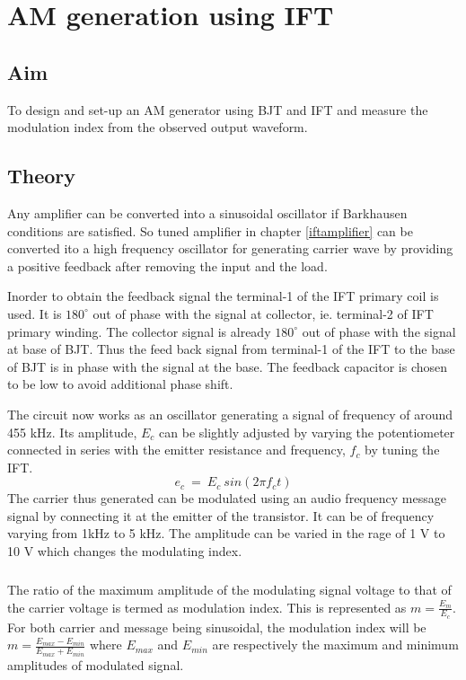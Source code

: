 \chapter[AM generation using IFT]{AM generation using IFT}

\section*{Aim}
To design and set-up  an AM generator using BJT and IFT and measure the modulation index from the observed output waveform.

\section*{Theory}
Any amplifier can be converted into a sinusoidal oscillator if Barkhausen conditions are satisfied. So tuned amplifier in chapter \ref{iftamplifier} can be converted ito a high frequency oscillator for generating carrier wave by providing a positive feedback after removing  the input and the load.

Inorder to obtain the feedback signal the terminal-1 of the IFT primary coil is used. It is $180^{\circ}$ out of phase with the signal at collector, ie. terminal-2 of IFT primary winding. The collector signal is already $180^{\circ}$ out of phase with the signal at base of BJT. Thus the feed back signal from terminal-1 of the IFT to the base of BJT is in phase with the signal at the base. The feedback capacitor is chosen to be low to avoid additional phase shift.  

The circuit now works as an oscillator generating a signal of frequency of around 455 kHz. Its amplitude, $E_c$ can be slightly adjusted by varying the potentiometer connected in series with the emitter resistance and frequency, $f_c$ by tuning the IFT.
\begin{equation}
e_c\ =\ E_c\ sin(2\pi f_ct)
\end{equation}
The carrier thus generated can be modulated using an audio frequency message signal by connecting it at the emitter of the transistor. It can be of frequency varying from 1kHz to 5 kHz. The amplitude can be varied in the rage of 1 V to 10 V which changes the modulating index.


\paragraph{}
The ratio of the maximum amplitude of the modulating signal voltage to that of the carrier voltage is termed as modulation index. This is represented as $m=\frac{E_m}{E_c}$. For both carrier and message being sinusoidal, the modulation index will be 
$m=\frac{E_{max}-E_{min}}{E_{max}+E_{min}}$
\noindent where $E_{max}$ and $E_{min}$ are respectively the maximum and minimum amplitudes of modulated signal.
